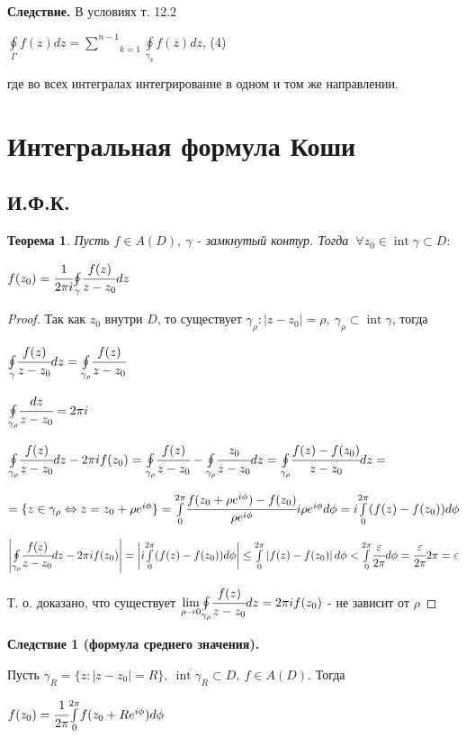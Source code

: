 \documentclass[draft]{report}
\newcommand{\mint}[2]{\underset{#1}{\overset{#2}{\int}}}
\newcommand{\moint}[1]{\underset{#1}{\oint}}
\newcommand{\msum}[2]{\underset{#1}{\overset{#2}{\sum}}}
\newcommand{\mlim}[1]{\underset{#1}{\lim}}
\newcommand{\LRA}{\Leftrightarrow}
\newcommand{\Int}{\mathop{\mathrm{int}}\nolimits}
\newcommand{\g}{\gamma}
\newcommand{\G}{\Gamma}
\renewcommand{\f}{\phi}
\newcommand{\F}{\ \forall}
\newtheorem*{theor}{Теорема}
\theoremstyle{remark}
\begin{document}
{\bfseries Следствие.}
В условиях т. 12.2

$\moint{\G}f(z)dz=\msum{k=1}{n-1}\moint{\g_k}f(z)dz$, (4)

где во всех интегралах интегрирование в одном и том же направлении.

\section{Интегральная формула Коши}

\subsection{И.Ф.К.}

\begin{theor}
Пусть $f\in A(D),\ \g$ - замкнутый контур. Тогда $\F z_0\in\Int\g\subset D:$

$f(z_0)=\cfrac{1}{2\pi i}\moint{\g}\cfrac{f(z)}{z-z_0}dz$
\end{theor}
\begin{proof}
Так как $z_0$ внутри $D$, то существует $\g_\rho\colon|z-z_0|=\rho,\ \g_\rho\subset\Int\g$, тогда

$\moint{\g}\cfrac{f(z)}{z-z_0}dz=\moint{\g_\rho}\cfrac{f(z)}{z-z_0}$

$\moint{\g_\rho}\cfrac{dz}{z-z_0}=2\pi i$

$\moint{\g_\rho}\cfrac{f(z)}{z-z_0}dz-2\pi if(z_0)=\moint{\g_\rho}\cfrac{f(z)}{z-z_0}-\moint{\g_\rho}\cfrac{z_0}{z-z_0}dz=\moint{\g_\rho}\cfrac{f(z)-f(z_0)}{z-z_0}dz=$

$=\{z\in\g_\rho \LRA z=z_0+\rho e^{i\f}\}=\mint{0}{2\pi}\cfrac{f(z_0+\rho e^{i\f})-f(z_0)}{\rho e^{i\f}}i\rho e^{i\f}d\f=i\mint{0}{2\pi}(f(z)-f(z_0))d\f$

$\left|\moint{\g_\rho}\cfrac{f(z)}{z-z_0}dz-2\pi if(z_0)\right|=\left|i\mint{0}{2\pi}(f(z)-f(z_0))d\f\right|\leq\mint{0}{2\pi}\left|f(z)-f(z_0)\right|d\f<\mint{0}{2\pi}\cfrac{\varepsilon}{2\pi}d\f=\cfrac{\varepsilon}{2\pi}2\pi=\varepsilon$

Т. о. доказано, что существует $\mlim{\rho\to0}\moint{\g_\rho}\cfrac{f(z)}{z-z_0}dz=2\pi if(z_0)$ - не зависит от $\rho$
\end{proof}

{\bfseries Следствие 1 (формула среднего значения).}

Пусть $\g_R=\{z\colon|z-z_0|=R\},\ \overline{\Int\g_R}\subset D,\ f\in A(D)$. Тогда 

$f(z_0)=\cfrac{1}{2\pi}\mint{0}{2\pi}f(z_0+Re^{i\f})d\f$
\end{document}
